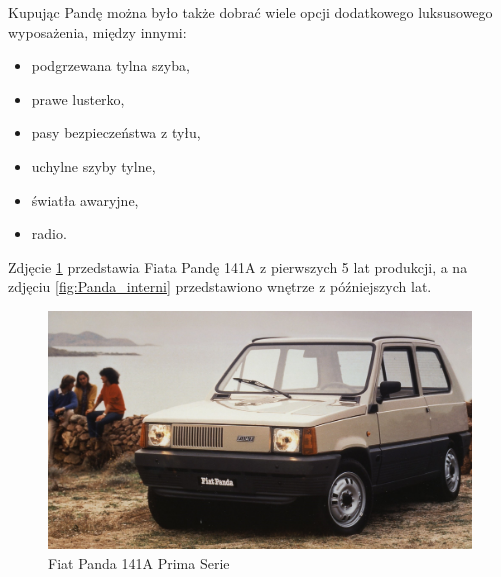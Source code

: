 Kupując Pandę można było także dobrać wiele opcji dodatkowego luksusowego wyposażenia, między innymi:
\begin{itemize}
    \item podgrzewana tylna szyba,
    \item prawe lusterko,
    \item pasy bezpieczeństwa z tyłu,
    \item uchylne szyby tylne,
    \item światła awaryjne,
    \item radio.
\end{itemize}

Zdjęcie \ref{fig:Panda_esterni} przedstawia Fiata Pandę 141A z pierwszych 5 lat produkcji, a na zdjęciu \ref{fig:Panda_interni} przedstawiono wnętrze z późniejszych lat.

\begin{figure}[H]
\includegraphics[scale=0.25]{pictures/dud/pic1.jpg}
\centering
\caption{Fiat Panda 141A Prima Serie}
\label{fig:Panda_esterni}
\end{figure}

